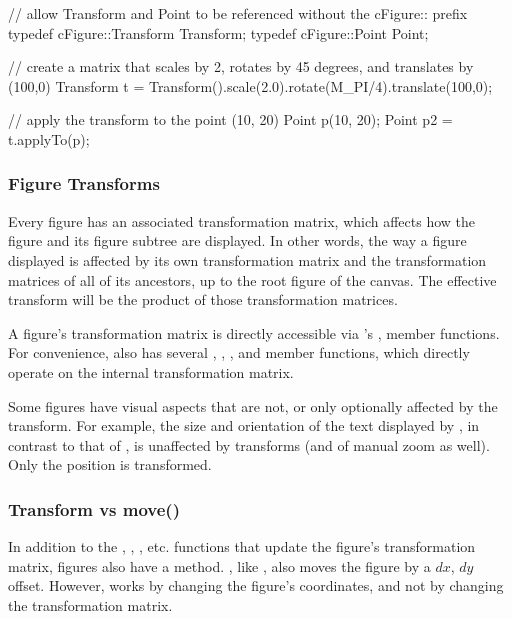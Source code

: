 \begin{cpp}
// allow Transform and Point to be referenced without the cFigure:: prefix
typedef cFigure::Transform Transform;
typedef cFigure::Point Point;

// create a matrix that scales by 2, rotates by 45 degrees, and translates by (100,0)
Transform t = Transform().scale(2.0).rotate(M_PI/4).translate(100,0);

// apply the transform to the point (10, 20)
Point p(10, 20);
Point p2 = t.applyTo(p);
\end{cpp}


\subsubsection{Figure Transforms}
\label{sec:graphics:figure-transforms}

Every figure has an associated transformation matrix, which
affects how the figure and its figure subtree are displayed.
In other words, the way a figure displayed is affected by its own
transformation matrix and the transformation matrices of all of its
ancestors, up to the root figure of the canvas. The effective transform
will be the product of those transformation matrices.

A figure's transformation matrix is directly accessible via 's
,  member functions.
For convenience,  also has several , ,
,  and  member functions,
which directly operate on the internal transformation matrix.

Some figures have visual aspects that are not, or only optionally affected
by the transform. For example, the size and orientation of the text
displayed by , in contrast to that of
, is unaffected by transforms (and of manual zoom as
well). Only the position is transformed.

\subsubsection{Transform vs move()}
\label{sec:graphics:figure-transform-vs-move}

In addition to the , , ,
etc. functions that update the figure's transformation matrix, figures also
have a  method. , like ,
also moves the figure by a $dx$, $dy$ offset. However,  works
by changing the figure's coordinates, and not by changing the
transformation matrix.

